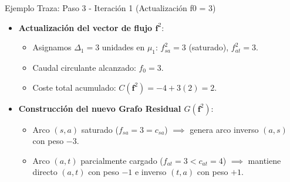 \documentclass[
  ignorenonframetext,
]{beamer}
\providecommand{\tightlist}{%
  \setlength{\itemsep}{0pt}\setlength{\parskip}{0pt}}
\begin{document}
\begin{frame}{Ejemplo Traza: Paso 3 - Iteración 1 (Actualización f0 =
3)}
\label{ejemplo-traza-paso-3---iteraciuxf3n-1-actualizaciuxf3n-f0-3}
\begin{itemize}
\tightlist
\item
  \textbf{Actualización del vector de flujo \(\mathbf{f}^2\)}:

  \begin{itemize}
  \tightlist
  \item
    Asignamos \(\Delta_1 = 3\) unidades en \(\mu_1\): \(f_{sa}^2 = 3\)
    (saturado), \(f_{at}^2 = 3\).
  \item
    Caudal circulante alcanzado: \(f_0 = 3\).
  \item
    Coste total acumulado: \(C(\mathbf{f}^2) = -4 + 3(2) = 2\).
  \end{itemize}
\item
  \textbf{Construcción del nuevo Grafo Residual \(G(\mathbf{f}^2)\)}:

  \begin{itemize}
  \tightlist
  \item
    Arco \((s,a)\) saturado (\(f_{sa}=3=c_{sa}\)) \(\implies\) genera
    arco inverso \((a,s)\) con peso \(-3\).
  \item
    Arco \((a,t)\) parcialmente cargado (\(f_{at}=3 < c_{at}=4\))
    \(\implies\) mantiene directo \((a,t)\) con peso \(-1\) e inverso
    \((t,a)\) con peso \(+1\).
  \end{itemize}
\end{itemize}
\end{frame}
\end{document}
